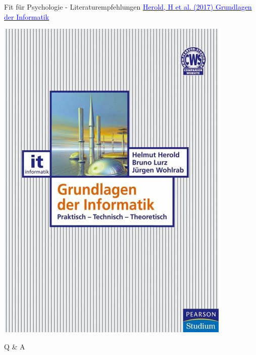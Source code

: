 \documentclass[
  8pt,
  ignorenonframetext,
  t]{beamer}
\begin{document}
\begin{frame}{Fit für Psychologie - Literaturempfehlungen}
\protect\hypertarget{fit-fuxfcr-psychologie---literaturempfehlungen-2}{}
\href{https://www.pearson.de/grundlagen-der-informatik-9783863268039}{\textcolor{blue}{Herold, H et al. (2017) Grundlagen der Informatik}}

\vspace{5mm}

\begin{center}\includegraphics[width=0.35\linewidth]{../Abbildungen/glmi_0_herold} \end{center}
\end{frame}

\begin{frame}[plain]{}
\protect\hypertarget{section-2}{}
Q \& A
\end{frame}
\end{document}

